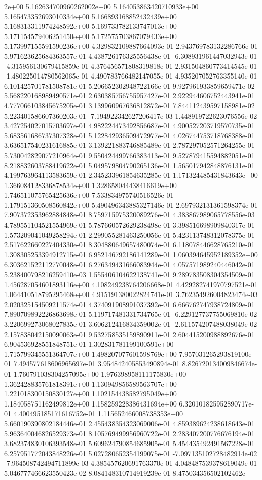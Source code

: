 2e+00	5.162634700960262002e+00	5.164053863420710933e+00	5.165473352693010334e+00	5.166893168852432439e+00	5.168313311974248592e+00	5.169733782133747013e+00	5.171154579406251450e+00	5.172575703867079433e+00	5.173997155591590236e+00
4.329832109887664093e-01	2.943769783132286766e-01	5.971623625684363557e-01	4.438726176325556438e-01	-6.308931961447032943e-01	-4.315956130679415859e-01	4.376456571808319818e-01	2.931504860773414545e-01	-1.480225014780562065e-01	4.490783766482147055e-01	4.935207052763355140e-01	6.101425701781508781e-01	5.206652302948722166e-01	9.927961933859659471e-02	5.568220168989490571e-01	2.630385756755957427e-01	2.922944606752443941e-01	4.777066103845675205e-01	3.139960967636812872e-01	7.844112439597158981e-02	5.223401586607360203e-01	-7.194922342627206417e-03	1.448919722623076556e-02	3.427254027015703697e-01	4.982224473492856687e-01	4.900527203719570735e-01	5.683561686737307328e-01	5.122842936509472977e-01	4.026744753718768388e-01	3.636517540231616885e-01	3.139221883746885489e-01	2.787297052571264255e-01	5.730042829077210964e-01	9.550424499766383413e-01	9.527879415594882051e-01	8.218832603788419622e-01	5.049579804790265136e-01	1.565017942848876131e-01	4.199763964113583659e-01	2.345233961854635285e-01	1.171324485431843643e+00	1.366084128336878534e+00	1.328658044438416619e+00	1.746511075765425636e+00	7.533834975740516526e-01	1.179151360508560842e+00	5.490496343885327146e-01	2.697932131361598374e-01	7.907372353962884848e-01	8.759715975320089276e-01	4.383867989065778556e-03	4.789551104521554969e-01	5.787660572629238498e-01	3.398516698909840317e-01	1.573209041049258294e-01	2.299055281463250056e-01	5.423113748312078375e-01	2.517622660227404330e-01	8.304880649657480074e-01	6.118078446628765210e-01	1.308305253394912715e-01	6.952146792186141289e-01	1.060394645952189352e+00	6.303621522112770048e-01	6.276349431666083944e-01	4.057571989240446042e-01	5.238400798216259410e-03	1.555406104622138741e-01	9.289783508304354509e-01	1.456287054601893116e+00	4.108249238764206668e-01	4.429282741970797521e-01	1.064410518795295468e+00	4.915191380022824741e-01	3.762354926004823474e-03	2.020325154509211574e-01	4.374091908991037392e-01	6.666762747938724809e-01	7.890709892226863698e-01	5.119717481331734765e-01	-6.229127737755069810e-02	3.220699273068027835e-01	3.606212416834359002e-01	-2.611574207488038049e-02	2.157838042150090063e-01	9.532758535159890911e-01	2.604415200988892676e-01	6.904536928551848751e-01	1.302831781199100591e+00	1.715799345551364707e+00	1.498207077601598769e+00	7.957031265293819100e-01	7.494577618606965697e-01	3.954842405853490894e-01	8.826720134009846674e-01	1.760791038304257095e+00	1.976398958111175830e+00	1.362428835761818391e+00	1.130949856589563707e+00	1.221018300150830127e+00	1.102154438582795049e+00	1.184058751162499812e+00	1.158259228386431694e+00	6.320101825952890717e-01	4.400495185171616752e-01	1.115652466008738353e+00	5.660190390802184446e-01	2.455438354323069006e-01	4.859389624238618643e-01	5.963640046826529373e-01	8.105769499956960722e-01	2.283407200776676194e-01	3.682374830106393548e-01	5.609624790854685905e-01	5.454435492491567228e-01	6.257951772043848226e-01	5.027280652354199075e-01	-7.097135102728482914e-02	-7.964508742494711899e-03	4.385457620691763370e-01	4.048487539378619049e-01	5.046777466623550423e-02	8.084148310714919239e-01	8.475034356502102462e-